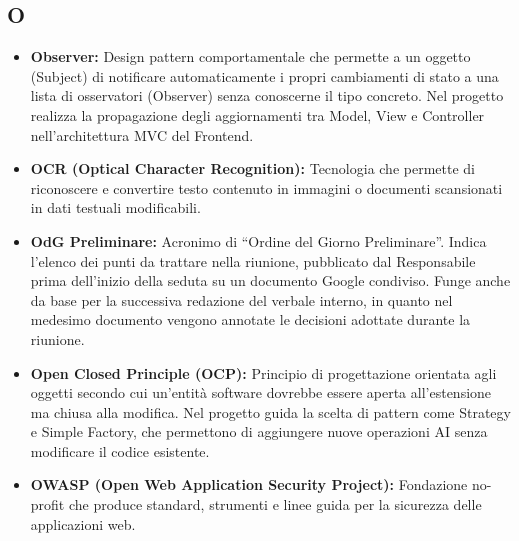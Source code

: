 {}
\subsection*{O}
\begin{itemize}[leftmargin=*]
    \item \textbf{Observer:} Design pattern comportamentale che permette a un oggetto (Subject) di notificare automaticamente i propri cambiamenti di stato a una lista di osservatori (Observer) senza conoscerne il tipo concreto. Nel progetto realizza la propagazione degli aggiornamenti tra Model, View e Controller nell'architettura MVC del Frontend.
    \item \textbf{OCR (Optical Character Recognition):} Tecnologia che permette di riconoscere e convertire testo contenuto in immagini o documenti scansionati in dati testuali modificabili.
    \item \textbf{OdG Preliminare:} Acronimo di ``Ordine del Giorno Preliminare''.
          Indica l'elenco dei punti da trattare nella riunione, pubblicato dal
          Responsabile prima dell'inizio della seduta su un documento Google
          condiviso. Funge anche da base per la successiva redazione del verbale
          interno, in quanto nel medesimo documento vengono annotate le decisioni
          adottate durante la riunione.
    \item \textbf{Open Closed Principle (OCP):} Principio di progettazione orientata agli oggetti secondo cui un'entità software dovrebbe essere aperta all'estensione ma chiusa alla modifica. Nel progetto guida la scelta di pattern come Strategy e Simple Factory, che permettono di aggiungere nuove operazioni AI senza modificare il codice esistente.
    \item \textbf{OWASP (Open Web Application Security Project):} Fondazione no-profit che produce standard, strumenti e linee guida per la sicurezza delle applicazioni web.
\end{itemize}
 
{}
